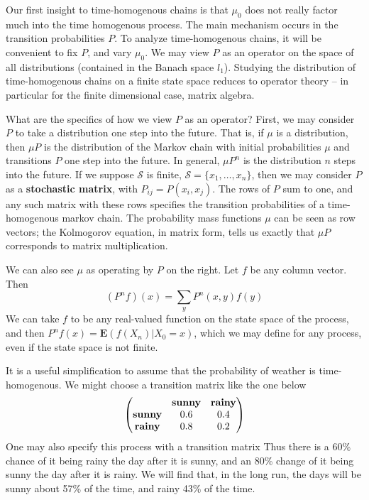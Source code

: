 Our first insight to time-homogenous chains is that $\mu_0$ does not really factor much into the time homogenous process. The main mechanism occurs in the transition probabilities $P$. To analyze time-homogenous chains, it will be convenient to fix $P$, and vary $\mu_0$. We may view $P$ as an operator on the space of all distributions (contained in the Banach space $l_1$). Studying the distribution of time-homogenous chains on a finite state space reduces to operator theory -- in particular for the finite dimensional case, matrix algebra.

What are the specifics of how we view $P$ as an operator? First, we may consider $P$ to take a distribution one step into the future. That is, if $\mu$ is a distribution, then $\mu P$ is the distribution of the Markov chain with initial probabilities $\mu$ and transitions $P$ one step into the future. In general, $\mu P^n$ is the distribution $n$ steps into the future. If we suppose $\mathcal{S}$ is finite, $\mathcal{S} = \{ x_1, \dots, x_n \}$, then we may consider $P$ as a {\bf stochastic matrix}, with $P_{ij} = P(x_i,x_j)$. The rows of $P$ sum to one, and any such matrix with these rows specifies the transition probabilities of a time-homogenous markov chain. The probability mass functions $\mu$ can be seen as row vectors; the Kolmogorov equation, in matrix form, tells us exactly that $\mu P$ corresponds to matrix multiplication.



We can also see $\mu$ as operating by $P$ on the right. Let $f$ be any column vector. Then
%
\[ (P^n f)(x) = \sum_y P^n(x,y) f(y) \]
%
We can take $f$ to be any real-valued function on the state space of the process, and then $P^n f (x) = \mathbf{E}(f(X_n) | X_0 = x)$, which we may define for any process, even if the state space is not finite.

\begin{example}
    It is a useful simplification to assume that the probability of weather is time-homogenous. We might choose a transition matrix like the one below
    \[ \begin{pmatrix}
    & {\bf sunny} & {\bf rainy} \\
    {\bf sunny} & 0.6 & 0.4 \\
    {\bf rainy} & 0.8 & 0.2 \end{pmatrix}
    \]
    One may also specify this process with a transition matrix
    Thus there is a 60\% chance of it being rainy the day after it is sunny, and an 80\% change of it being sunny the day after it is rainy. We will find that, in the long run, the days will be sunny about 57\% of the time, and rainy 43\% of the time.
\end{example}

